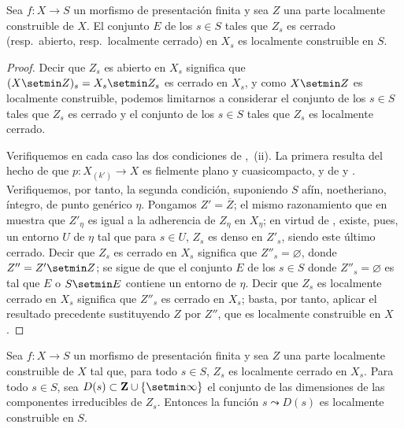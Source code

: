 \begin{corollary}[9.5.4]
\label{IV.9.5.4}
Sea $f:X\to S$ un morfismo de presentación finita y sea $Z$ una parte localmente construible de $X$.
El conjunto $E$ de los $s\in S$ tales que $Z_s$ es cerrado \textup{(resp.}\ abierto, \textup{resp.}\ localmente cerrado\textup{)} en $X_s$ es localmente construible en $S$.
\end{corollary}

\begin{proof}
Decir que $Z_s$ es abierto en $X_s$ significa que $(X\setmin Z)_s=X_s\setmin Z_s$ es cerrado en $X_s$, y como $X\setmin Z$ es localmente construible, podemos limitarnos a considerar el conjunto de los $s\in S$ tales que $Z_s$ es cerrado y el conjunto de los $s\in S$ tales que $Z_s$ es localmente cerrado.

Verifiquemos en cada caso las dos condiciones de ,~(ii).
La primera resulta del hecho de que $p:X_{(k')}\to X$ es fielmente plano y cuasicompacto, y de  y .
Verifiquemos, por tanto, la segunda condición, suponiendo $S$ afín, noetheriano, íntegro, de punto genérico $\eta$.
Pongamos $Z'=\overline{Z}$; el mismo razonamiento que en  muestra que $Z'_\eta$ es igual a la adherencia de $Z_\eta$ en $X_\eta$; en virtud de , existe, pues, un entorno $U$ de $\eta$ tal que para $s\in U$, $Z_s$ es denso en $Z'_s$, siendo este último cerrado.
Decir que $Z_s$ es cerrado en $X_s$ significa que $Z''_s=\varnothing$, donde $Z''=Z'\setmin Z$; se sigue de  que el conjunto $E$ de los $s\in S$ donde $Z''_s=\varnothing$ es tal que $E$ o $S\setmin E$ contiene un entorno de $\eta$.
Decir que $Z_s$ es localmente cerrado en $X_s$ significa que $Z''_s$ es cerrado en $X_s$; basta, por tanto, aplicar el resultado precedente sustituyendo $Z$ por $Z''$, que es localmente construible en $X$.
\end{proof}


\begin{proposition}[9.5.5]
\label{IV.9.5.5}
Sea $f:X\to S$ un morfismo de presentación finita y sea $Z$ una parte localmente construible de $X$ tal que, para todo $s\in S$, $Z_s$ es localmente cerrado en $X_s$.
Para todo $s\in S$, sea $D(s)\subset\mathbf{Z}\cup\{\setmin\infty\}$ el conjunto de las dimensiones de las componentes irreducibles de $Z_s$.
Entonces la función $s\leadsto D(s)$ es localmente construible en $S$.
\end{proposition}

